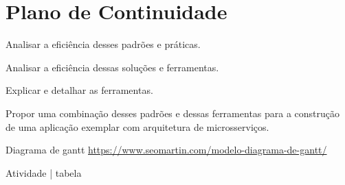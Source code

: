 \chapter*{Plano de Continuidade}

Analisar a eficiência desses padrões e práticas.

Analisar a eficiência dessas soluções e ferramentas.

Explicar e detalhar as ferramentas.

Propor uma combinação desses padrões e dessas ferramentas para a construção de uma aplicação exemplar com arquitetura de microsserviços.


Diagrama de gantt \url{https://www.seomartin.com/modelo-diagrama-de-gantt/}

Atividade | tabela